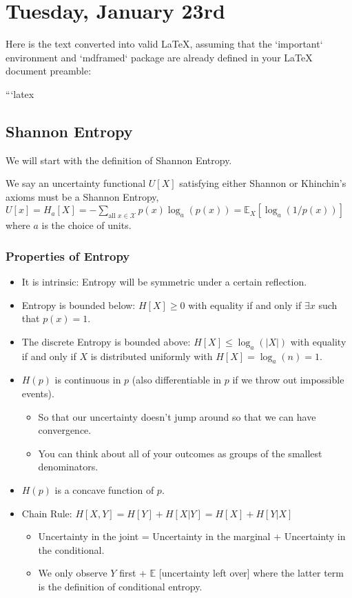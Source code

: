 \section{Tuesday, January 23rd}
Here is the text converted into valid LaTeX, assuming that the `important` environment and `mdframed` package are already defined in your LaTeX document preamble:

```latex
\subsection{Shannon Entropy}

We will start with the definition of Shannon Entropy.

We say an uncertainty functional \( U[X] \) satisfying either Shannon or Khinchin's axioms must be a Shannon Entropy, \( U[x]=H_a[X]=- \sum_{\text{all } x \in \mathcal{X}} p(x) \log_a(p(x)) = \mathbb{E}_X[\log_a(1/p(x))] \) where \( a \) is the choice of units.

\subsubsection{Properties of Entropy}
\begin{itemize}
  \item It is intrinsic: Entropy will be symmetric under a certain reflection.
  \item Entropy is bounded below: \( H[X] \geq 0 \) with equality if and only if \( \exists x \) such that \( p(x)=1 \).
  \item The discrete Entropy is bounded above: \( H[X] \leq \log_a(|X|) \) with equality if and only if \( X \) is distributed uniformly with \( H[X]=\log_a(n)=1 \).
  \item \( H(p) \) is continuous in \( p \) (also differentiable in \( p \) if we throw out impossible events).
  \begin{itemize}
      \item So that our uncertainty doesn’t jump around so that we can have convergence.
      \item You can think about all of your outcomes as groups of the smallest denominators.
  \end{itemize}
  \item \( H(p) \) is a concave function of \( p \).
  \item Chain Rule: \( H[X, Y] = H[Y] + H[X | Y] = H[X] + H[Y | X] \)
  \begin{itemize}
      \item Uncertainty in the joint = Uncertainty in the marginal + Uncertainty in the conditional.
      \item We only observe \( Y \) first + \( \mathbb{E} \) [uncertainty left over] where the latter term is the definition of conditional entropy.
  \end{itemize}
\end{itemize}

